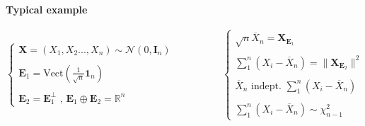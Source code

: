 \documentclass[a4paper,10pt]{article}
\begin{document}
\paragraph{Typical example}
\[
\left\{
\begin{array}{l}
\textbf{X} = (X_1,X_2 ...,X_n) \sim \mathcal{N}(0, \textbf{I}_n) \\ \\
\textbf{E}_1 = \text{Vect}(\frac{1}{\sqrt{n}} \mathbf{1}_n) \\ \\
\textbf{E}_2 = \textbf{E}_1^{\bot} \text{ , } \textbf{E}_1\oplus\textbf{E}_2= \mathbb{R}^n
\end{array}\right.
\hspace{2cm}
\left\{
\begin{array}{l}
 \sqrt{n} \overline{X}_n =  \textbf{X}_{\textbf{E}_1}\\ \\
 \sum^n_1 (X_i- \overline{X}_n) = \| \textbf{X}_{\textbf{E}_2} \|^{2} \\ \\
\overline{X}_n \text{ indept. } \sum^n_1 (X_i- \overline{X}_n) \\ \\
\sum^n_1 (X_i- \overline{X}_n) \sim \chi^2_{n-1}
\end{array}\right. 
\]





\end{document}

